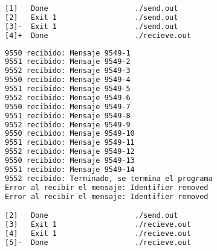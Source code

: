 \begin{lstlisting}[language=bash, style=CodeStyle, caption=Tres productores y un consumidor, label=lst:3producidores1consumidor]
[1]   Done                    ./send.out
[2]   Exit 1                  ./send.out
[3]-  Exit 1                  ./send.out
[4]+  Done                    ./recieve.out
\end{lstlisting}

\begin{lstlisting}[language=bash, style=CodeStyle, caption=Tres consumidores para un productor único, label=lst:3consumidores1producidor]
9550 recibido: Mensaje 9549-1
9551 recibido: Mensaje 9549-2
9552 recibido: Mensaje 9549-3
9550 recibido: Mensaje 9549-4
9551 recibido: Mensaje 9549-5
9552 recibido: Mensaje 9549-6
9550 recibido: Mensaje 9549-7
9551 recibido: Mensaje 9549-8
9552 recibido: Mensaje 9549-9
9550 recibido: Mensaje 9549-10
9551 recibido: Mensaje 9549-11
9552 recibido: Mensaje 9549-12
9550 recibido: Mensaje 9549-13
9551 recibido: Mensaje 9549-14
9552 recibido: Terminado, se termina el programa
Error al recibir el mensaje: Identifier removed
Error al recibir el mensaje: Identifier removed

[2]   Done                    ./send.out
[3]   Exit 1                  ./recieve.out
[4]   Exit 1                  ./recieve.out
[5]-  Done                    ./recieve.out
\end{lstlisting}

